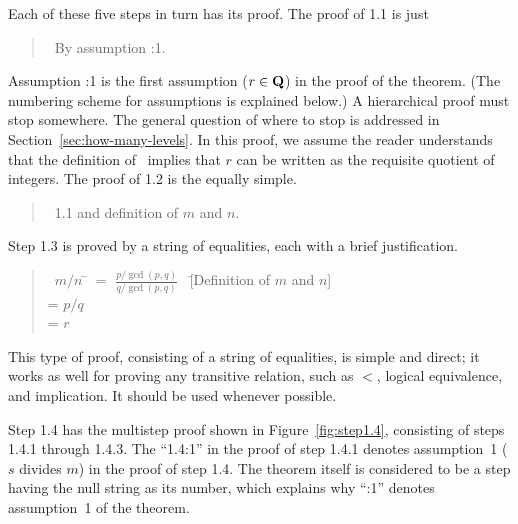 Each of these five steps in turn has its proof.  The proof of 1.1 is
just
\begin{quote}\small
\pf\ By assumption :1.
\end{quote}
Assumption :1 is the first assumption ($r\in{\bf Q}$) in the proof of the
theorem.  (The numbering scheme for assumptions is explained below.)
A hierarchical proof must stop somewhere.  The general question of
where to stop is addressed in Section~\ref{sec:how-many-levels}.  In
this proof, we assume the reader understands that the definition
of \Q\ implies that $r$ can be written as the requisite quotient of
integers.  The proof of 1.2 is the equally simple.
\begin{quote}\small
\pf\ 1.1 and definition of $m$ and $n$.
\end{quote}
Step 1.3 is proved by a string of equalities, each with a brief
justification.
\begin{quote}\small
\begin{tabbing}
\pf\ $m/n$ \= $=$ $\displaystyle\frac{p/\gcd(p,q)}{q/\gcd(p,q)}$ \ 
                                  \= [Definition of $m$ and $n$]\\
                  \> = $p/q$ \> [Simple algebra]\\
                  \> = $r$  \> [By 1.1]
\end{tabbing}
\end{quote}
This type of proof, consisting of a string of equalities, is simple
and direct; it works as well for proving any transitive relation, such
as $<$, logical equivalence, and implication.  It should be used
whenever possible.

Step 1.4 has the multistep proof shown in Figure~\ref{fig:step1.4},
consisting of steps 1.4.1 through 1.4.3.  The ``1.4:1'' in the proof
of step 1.4.1 denotes assumption~1 ($s$ divides $m$) in the proof of
step 1.4.  The theorem itself is considered to be a step having the
null string as its number, which explains why ``:1'' denotes
assumption~1 of the theorem.


